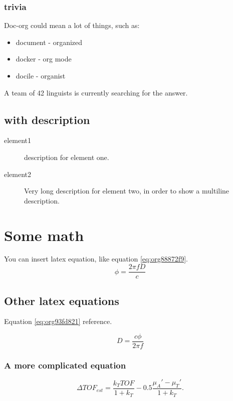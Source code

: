\subsubsection{trivia}
\label{sec:orgdb05289}
Doc-org could mean a lot of things, such as:
\begin{itemize}
\item document - organized
\item docker - org mode
\item docile - organist
\end{itemize}
A team of 42 linguists is currently searching for the answer.
\subsection{with description}
\label{sec:orge74a4ab}
\begin{description}
\item[{element1}] description for element one.
\item[{element2}] Very long description for element two, in order to show a
multiline description.
\end{description}

\section{Some math}
\label{sec:org79a3546}
You can insert latex equation, like equation \ref{eq:org88872f9}.
\begin{equation}
\label{eq:org88872f9}
\phi = \frac{2\pi fD}{c}
\end{equation}
\subsection{Other latex equations}
\label{sec:orge0f1da7}
Equation \ref{eq:org93fd821} reference.

\begin{equation}
\label{eq:org93fd821}
D = \frac{c\phi}{2\pi f}
\end{equation}

\subsubsection{A more complicated equation}
\label{sec:orgaf452ec}

\begin{equation}
\Delta TOF_{est} = \frac{k_T TOF}{1+k_T } - 0.5 \frac{\mu_A' - \mu_T'}{1+k_T}.
\end{equation}

